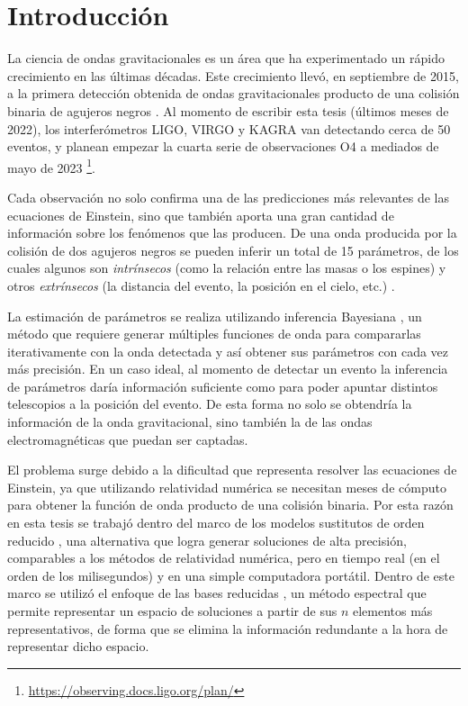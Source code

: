 \chapter{Introducción}

 
La ciencia de ondas gravitacionales es un área que ha experimentado un rápido crecimiento en las últimas décadas. Este crecimiento llevó, en septiembre de 2015, a la primera detección obtenida de ondas gravitacionales producto de una colisión binaria de agujeros negros \cite{https://doi.org/10.48550/arxiv.1607.05251, LIGOScientific:2016aoc}. Al momento de escribir esta tesis (últimos meses de 2022), los interferómetros LIGO, VIRGO y KAGRA van detectando cerca de 50 eventos, y planean empezar la cuarta serie de observaciones O4 a mediados de mayo de 2023 \footnote{\url{https://observing.docs.ligo.org/plan/}}.


Cada observación no solo confirma una de las predicciones más relevantes de las ecuaciones de Einstein, sino que también aporta una gran cantidad de información sobre los fenómenos que las producen. De una onda producida por la colisión de dos agujeros negros se pueden inferir un total de 15 parámetros, de los cuales algunos son \textit{intrínsecos} (como la relación entre las masas o los espines) y otros \textit{extrínsecos} (la distancia del evento, la posición en el cielo, etc.) \cite{Veitch_2015}.


La estimación de parámetros se realiza utilizando inferencia Bayesiana \cite{Thrane_2019}, un método que requiere generar múltiples funciones de onda para compararlas iterativamente con la onda detectada y así obtener sus parámetros con cada vez más precisión. En un caso ideal, al momento de detectar un evento la inferencia de parámetros daría información suficiente como para poder apuntar distintos telescopios a la posición del evento. De esta forma no solo se obtendría la información de la onda gravitacional, sino también la de las ondas electromagnéticas que puedan ser captadas. 

El problema surge debido a la dificultad que representa resolver las ecuaciones de Einstein, ya que utilizando relatividad numérica se necesitan meses de cómputo para obtener la función de onda producto de una colisión binaria. Por esta razón en esta tesis se trabajó dentro del marco de los modelos sustitutos de orden reducido \cite{Field_2014, Tiglio:2021ysj}, una alternativa que logra generar soluciones de alta precisión, comparables a los métodos de relatividad numérica, pero en tiempo real (en el orden de los milisegundos) y en una simple computadora portátil. Dentro de este marco se utilizó el enfoque de las bases reducidas \cite{rb0book, doi:10.1137/09075250X, PhysRevLett.106.221102, 10.1115/1.1448332, rb1book}, un método espectral que permite representar un espacio de soluciones a partir de sus $n$ elementos más representativos, de forma que se elimina la información redundante a la hora de representar dicho espacio.



